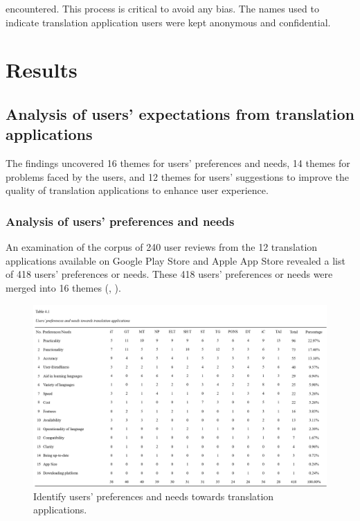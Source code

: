 \documentclass[english]{textolivre}
\begin{document}
encountered. This process is critical to avoid any bias. The names used to indicate translation application users were kept anonymous and confidential.

\section{Results}\label{sec-resumo}
\subsection{Analysis of users’ expectations from translation applications}
The findings uncovered 16 themes for users’ preferences and needs, 14 themes for problems faced by the users, and 12 themes for users’ suggestions to improve the quality of translation applications to enhance user experience.

\subsubsection{Analysis of users’ preferences and needs}\label{sec-secoes}
An examination of the corpus of 240 user reviews from the 12 translation applications available on Google Play Store and Apple App Store revealed a list of 418 users’ preferences or needs. These 418 users’ preferences or needs were merged into 16 themes (, ).

\begin{figure}[h!]
    \centering
    \includegraphics[width=\linewidth]{Fig2.png}
    \caption{Identify users’ preferences and needs towards translation applications.}
    \label{fig2}
\end{figure}
\end{document}
